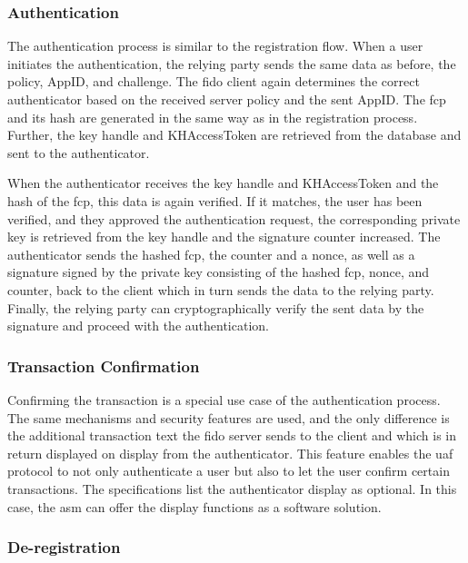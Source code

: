 \subsubsection{Authentication}

The authentication process is similar to the registration flow. When a user initiates the authentication, the relying party sends the same data as before, the policy, AppID, and challenge. The \gls{fido} client again determines the correct authenticator based on the received server policy and the sent AppID. The \gls{fcp} and its hash are generated in the same way as in the registration process. Further, the key handle and KHAccessToken are retrieved from the database and sent to the authenticator.

When the authenticator receives the key handle and KHAccessToken and the hash of the \gls{fcp}, this data is again verified. If it matches, the user has been verified, and they approved the authentication request, the corresponding private key is retrieved from the key handle and the signature counter increased. The authenticator sends the hashed \gls{fcp}, the counter and a \gls{nonce}, as well as a signature signed by the private key consisting of the hashed \gls{fcp}, nonce, and counter, back to the client which in turn sends the data to the relying party. Finally, the relying party can cryptographically verify the sent data by the signature and proceed with the authentication.

\subsubsection{Transaction Confirmation}

Confirming the transaction is a special use case of the authentication process. The same mechanisms and security features are used, and the only difference is the additional transaction text the \gls{fido} server sends to the client and which is in return displayed on display from the authenticator. This feature enables the \gls{uaf} protocol to not only authenticate a user but also to let the user confirm certain transactions. The specifications list the authenticator display as optional. In this case, the \gls{asm} can offer the display functions as a software solution.

\subsubsection{De-registration}

